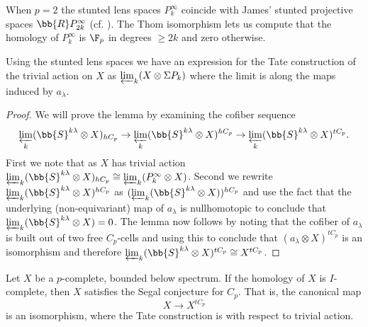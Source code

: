When $p=2$ the stunted lens spaces $P_k^\infty$ coincide with James' stunted projective spaces $\bb{R}P^\infty_{2k}$ \cite{james1959spaces} (cf. \cite{atiyah1961thom}). The Thom isomorphism lets us compute that the homology of $P_k^\infty$ is $\F_p$ in degrees $\geq 2k$ and zero otherwise.


\begin{lem} \label{tatelimit}
    Using the stunted lens spaces we have an expression for the Tate construction of the trivial action on $X$ as $ \varprojlim_{k} (X \otimes \Sigma P_{k}) $
    where the limit is along the maps induced by $a_\lambda$.
\end{lem}

\begin{proof}
    We will prove the lemma by examining the cofiber sequence
    \[ \varprojlim_k (\bb{S}^{k\lambda} \otimes X)_{hC_p} \to \varprojlim_k (\bb{S}^{k\lambda} \otimes X)^{hC_p} \to \varprojlim_k (\bb{S}^{k\lambda} \otimes X)^{tC_p}. \]
    First we note that as $X$ has trivial action 
    $\varprojlim_k (\bb{S}^{k\lambda} \otimes X)_{hC_p} \cong \varprojlim_k (P_k^\infty \otimes X)$.
    Second we rewrite $\varprojlim_k (\bb{S}^{k\lambda} \otimes X)^{hC_p} $ as
    $  ( \varprojlim_k (\bb{S}^{k\lambda} \otimes X) )^{hC_p} $
    and use the fact that the underlying (non-equivariant) map of $a_\lambda$ is nullhomotopic
    to conclude that $ \varprojlim_k (\bb{S}^{k\lambda} \otimes X) = 0$.
    The lemma now follows by noting that the cofiber of $a_\lambda$ is built out of two free $C_p$-cells and using this to conclude that $(a_\lambda \otimes X)^{tC_p}$ is an isomorphism and therefore
    $ \varprojlim_k (\bb{S}^{k\lambda} \otimes X)^{tC_p} \cong X^{tC_p}$.    
\end{proof}



\begin{thm} \label{segalconjIcmpl}
    Let $X$ be a $p$-complete, bounded below spectrum.
    If the homology of $X$ is $I$-complete, then $X$ satisfies the Segal conjecture for $C_p$. 
    That is, the canonical map 
    \[ X \rightarrow X^{tC_p} \] 
    is an isomorphism, where the Tate construction is with respect to trivial action.
\end{thm}
 
